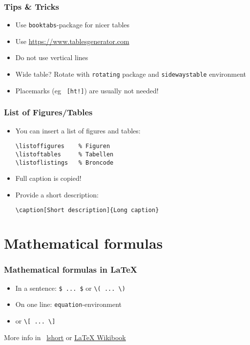 \documentclass[aspectratio=169]{beamer}
\begin{document}
\begin{frame}
  \frametitle{Tips \& Tricks}

  \begin{itemize}
   \item Use \texttt{booktabs}-package for nicer tables
   \item Use \url{https://www.tablesgenerator.com}
   \item Do not use vertical lines
   \item Wide table? Rotate with \texttt{rotating} package and \texttt{sidewaystable} environment
   \item Placemarks (eg ~\texttt{[ht!]}) are usually not needed!
  \end{itemize}

\end{frame}

\begin{frame}[fragile]
  \frametitle{List of Figures/Tables}

  \begin{itemize}
    \item You can insert a list of figures and tables:
\begin{verbatim}
\listoffigures    % Figuren
\listoftables     % Tabellen
\listoflistings   % Broncode
\end{verbatim}
    \item Full caption is copied!
    \item Provide a short description:
    
      \verb|\caption[Short description]{Long caption}|
  \end{itemize}

\end{frame}

\section{Mathematical formulas}

\begin{frame}[fragile]
  \frametitle{Mathematical formulas in {\LaTeX}}

  \begin{itemize}
   \item In a sentence: \verb+$ ... $+ or \verb+\( ... \)+
   \item On one line: \texttt{equation}-environment
   \item or \verb+\[ ... \]+
  \end{itemize}

  More info in ~\href{https://tobi.oetiker.ch/lshort/lshort.pdf}{lshort} or \href{https://en.wikibooks.org/wiki/LaTeX/Mathematics}{LaTeX Wikibook}

\end{frame}
\end{document}
